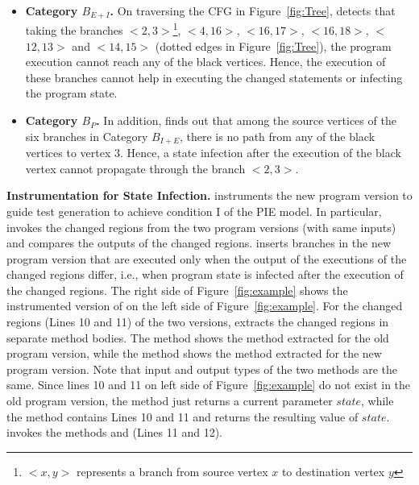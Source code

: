 \begin{itemize}
\vspace{-1ex}
\item \textbf{Category $B_{E+I}$.} On traversing the CFG in Figure~\ref{fig:Tree},  detects that taking the branches $<$$2, 3$$>$\footnote{$<$$x,y$$>$ represents a branch from source vertex $x$ to destination vertex $y$}, $<$$4, 16$$>$, $<$$16, 17$$>$, $<$$16, 18$$>$, $<$$12, 13$$>$ and $<$$14, 15$$>$ (dotted edges in Figure~\ref{fig:Tree}), the program execution cannot reach any of the black vertices. Hence, the execution of these branches cannot help in executing the changed statements or infecting the program state. \\ 
\vspace{-1ex} 
\item \textbf{Category $B_{P}$.} In addition,  finds out that 
among the source vertices of the six branches in Category $B_{I+E}$, there is no path from any of the 
black vertices to vertex 3. Hence, a state infection after the execution of the black vertex 
cannot propagate through the branch $<2,3>$.
\end{itemize}
\vspace{-0.2cm}
\textbf{Instrumentation for State Infection.}
 instruments the new program version to guide test generation to achieve condition I of the PIE model.
In particular,  invokes the changed regions from the two program versions (with same inputs) and 
compares the outputs of the changed regions. 
 inserts branches in the new program version that are executed only 
when the output of the executions of the changed regions differ, i.e., when program
state is infected after the execution of the changed regions.
The right side of Figure~\ref{fig:example} shows the instrumented version of  on the left side of 
Figure~\ref{fig:example}. For the changed regions (Lines 10 and 11) of the two versions,  extracts the
changed regions in separate method bodies. The method  shows the method extracted for the old program version,
while the method  shows the method extracted for the new program version.
Note that input and output types of the two methods are the same. 
Since lines 10 and 11 on left side of Figure~\ref{fig:example} do not exist in the old program version, the method  just returns a current parameter $state$,
while the method  contains Lines 10 and 11 and returns the resulting value of $state$.
 invokes the methods  and  (Lines 11 and 12). 
